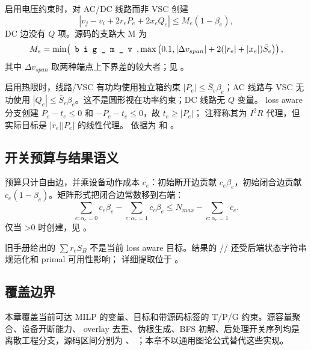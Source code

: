 启用电压约束时，对 AC/DC 线路而非 VSC 创建
\begin{equation}
 |v_j-v_i+2r_eP_e+2x_eQ_e|\le M_e(1-\beta_e),
\end{equation}
DC 边没有 $Q$ 项。源码的支路大 M 为
\begin{equation}
 M_e=\min\!\left(\fld{big\_m\_v},
 \max\left(0.1,|\Delta v_{span}|+2(|r_e|+|x_e|)\bar S_e\right)\right),
\end{equation}
其中 $\Delta v_{span}$ 取两种端点上下界差的较大者；见
。

启用热限时，线路/VSC 有功均使用独立箱约束
$|P_e|\le\bar S_e\beta_e$；AC 线路与 VSC 无功使用
$|Q_e|\le\bar S_e\beta_e$。这不是圆形视在功率约束；DC 线路无 $Q$ 变量。
loss aware 分支创建 $P_e-t_e\le0$ 和 $-P_e-t_e\le0$，故 $t_e\ge|P_e|$；
注释称其为 $I^2R$ 代理，但实际目标是 $|r_e||P_e|$ 的线性代理。
依据为  和
。

\subsection{开关预算与结果语义}

预算只计自由边，并乘设备动作成本 $c_e$：初始断开边贡献 $c_e\beta_e$，初始闭合边贡献
$c_e(1-\beta_e)$。矩阵形式把闭合边常数移到右端：
\begin{equation}
 \sum_{e:\alpha_e=0}c_e\beta_e-
 \sum_{e:\alpha_e=1}c_e\beta_e
 \le N_{max}-\sum_{e:\alpha_e=1}c_e.
\end{equation}
仅当 >0 时创建，见
。

旧手册给出的 $\sum r_eS_B$ 不是当前 loss aware 目标。结果的
// 还受后端状态字符串规范化和 primal 可用性影响；
详细提取位于 。

\subsection{覆盖边界}

本章覆盖当前可达 MILP 的变量、目标和带源码标签的 T/P/G 约束。源容量聚合、设备开断能力、
overlay 去重、伪根生成、BFS 初解、后处理开关序列均是离散工程分支，源码区间分别为
、
；本章不以通用图论公式替代这些实现。
